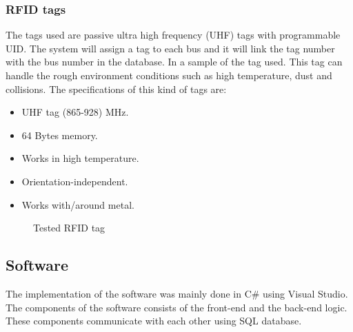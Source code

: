 \documentclass[a4paper,twoside]{IEEEtran}
\begin{document}
\subsubsection{RFID tags}
The tags used are passive ultra high frequency (UHF) tags with programmable UID. The system will assign a tag to each bus and it will link the tag number with the bus number in the database. In  a sample of the tag used. This tag can handle the rough environment conditions such as high temperature, dust and collisions.
The specifications of this kind of tags are\cite{2}:
\begin{itemize}
\item
UHF tag (865-928) MHz.
\item
64 Bytes memory.
\item
Works in high temperature.
\item
Orientation-independent.
\item
Works with/around metal.
\end{itemize}
\begin{figure}[h]
\centering
{}
\caption{Tested RFID tag}
\label{tag}
\end{figure}
\subsection{Software}
The implementation of the software was mainly done in C\# using Visual Studio. The components of the software consists of the front-end and the back-end logic. These components communicate with each other using SQL database.
\end{document}
